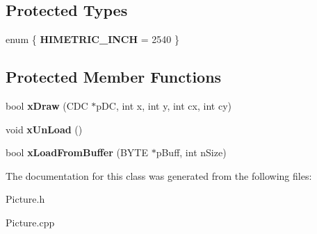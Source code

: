 \subsection*{Protected Types}
\begin{DoxyCompactItemize}
\item 
enum \{ {\bfseries H\-I\-M\-E\-T\-R\-I\-C\-\_\-\-I\-N\-C\-H} =  2540
 \}
\end{DoxyCompactItemize}
\subsection*{Protected Member Functions}
\begin{DoxyCompactItemize}
\item 
\hypertarget{class_c_picture_aa9cc40c45ceb3e756b87afa45f9f8bd5}{bool {\bfseries x\-Draw} (C\-D\-C $\ast$p\-D\-C, int x, int y, int cx, int cy)}\label{class_c_picture_aa9cc40c45ceb3e756b87afa45f9f8bd5}

\item 
\hypertarget{class_c_picture_a0bf3d16725c07cbeb1a8a570d1ba720a}{void {\bfseries x\-Un\-Load} ()}\label{class_c_picture_a0bf3d16725c07cbeb1a8a570d1ba720a}

\item 
\hypertarget{class_c_picture_a9a9be2717b10e4a526ec78072bd85265}{bool {\bfseries x\-Load\-From\-Buffer} (B\-Y\-T\-E $\ast$p\-Buff, int n\-Size)}\label{class_c_picture_a9a9be2717b10e4a526ec78072bd85265}

\end{DoxyCompactItemize}


The documentation for this class was generated from the following files\-:\begin{DoxyCompactItemize}
\item 
Picture.\-h\item 
Picture.\-cpp\end{DoxyCompactItemize}
